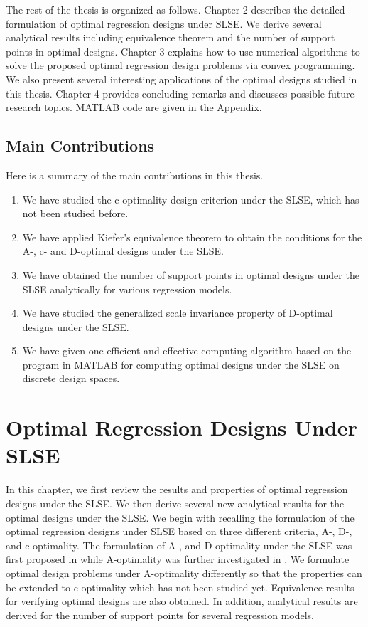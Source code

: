 \documentclass[
]{book}
\theoremstyle{definition}
\theoremstyle{definition}
\theoremstyle{definition}
\theoremstyle{definition}
\theoremstyle{remark}
\begin{document}
The rest of the thesis is organized as follows. Chapter 2 describes the detailed formulation of optimal regression designs under SLSE. We derive several analytical results including equivalence theorem and the number of support points in optimal designs. Chapter 3 explains how to use numerical algorithms to solve the proposed optimal regression design problems via convex programming. We also present several interesting applications of the optimal designs studied in this thesis. Chapter 4 provides concluding remarks and discusses possible future research topics. MATLAB code are given in the Appendix.

\section{Main Contributions}\label{main-contributions}

Here is a summary of the main contributions in this thesis.

\begin{enumerate}
\def\labelenumi{\arabic{enumi}.}
\item
  We have studied the c-optimality design criterion under the SLSE, which has not been studied before.
\item
  We have applied Kiefer's equivalence theorem \citep{kiefer1974general} to obtain the conditions for the A-, c- and D-optimal designs under the SLSE.
\item
  We have obtained the number of support points in optimal designs under the SLSE analytically for various regression models.
\item
  We have studied the generalized scale invariance property of D-optimal designs under the SLSE.
\item
  We have given one efficient and effective computing algorithm based on the program in MATLAB for computing optimal designs under the SLSE on discrete design spaces.
\end{enumerate}

\chapter{Optimal Regression Designs Under SLSE}\label{chapter-SLSE}

In this chapter, we first review the results and properties of optimal regression designs under the SLSE. We then derive several new analytical results for the optimal designs under the SLSE. We begin with recalling the formulation of the optimal regression designs under SLSE based on three different criteria, A-, D-, and c-optimality. The formulation of A-, and D-optimality under the SLSE was first proposed in \citet{gao2014new} while A-optimality was further investigated in \citet{yin2018optimal}. We formulate optimal design problems under A-optimality differently so that the properties can be extended to c-optimality which has not been studied yet. Equivalence results for verifying optimal designs are also obtained. In addition, analytical results are derived for the number of support points for several regression models.
\end{document}
